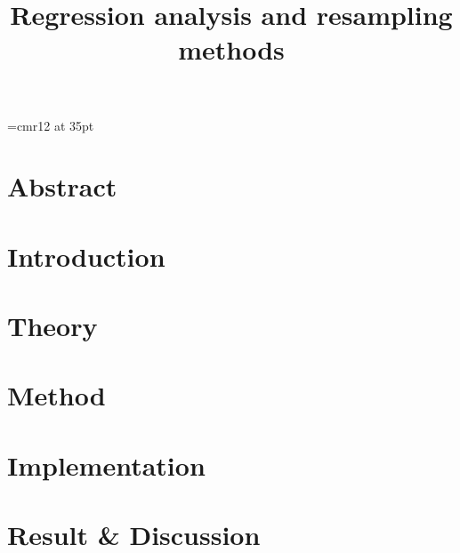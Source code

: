 
\font\myfont=cmr12 at 35pt
\title{\textbf{{\myfont Regression analysis and resampling methods}}}

\mnfrontpage


\pagestyle{fancy}
\fancyhf{}
\fancyfoot[CE,LO]{\leftmark}

\renewcommand{\headrulewidth}{2pt}
\renewcommand{\footrulewidth}{1pt}

\tableofcontents


\section*{Abstract}%

\cite{compphys}

\pagebreak
\section{Introduction}



\section{Theory}\label{sec:theory}


\label{sec:lalalla}
\label{eq:lalalla}
\label{tab:lalalla}
\label{fig:lalalla}

\pagebreak
\section{Method}



\pagebreak
\section{Implementation}



\pagebreak
\section{Result \& Discussion}





%


